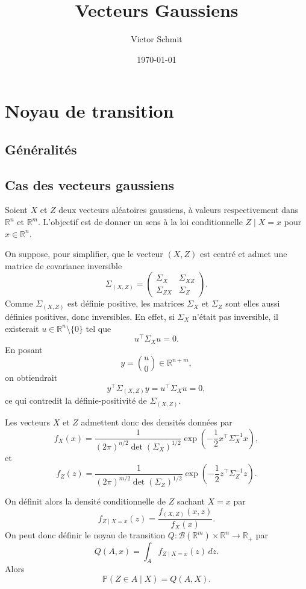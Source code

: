 \documentclass[10pt]{article}
\title{Vecteurs Gaussiens}
\author{Victor Schmit}
\date{\today}
\newcommand{\R}{\mathbb{R}}
\begin{document}
\maketitle

\tableofcontents
\newpage

\section{Noyau de transition}

\subsection{Généralités}

\subsection{Cas des vecteurs gaussiens}

Soient $X$ et $Z$ deux vecteurs aléatoires gaussiens, à valeurs respectivement dans $\R^n$ et $\R^m$.
L'objectif est de donner un sens à la loi conditionnelle $Z \mid X=x$ pour $x \in \R^n$.

\medskip

On suppose, pour simplifier, que le vecteur $(X,Z)$ est centré et admet une matrice de covariance inversible
\[
	\Sigma_{(X,Z)} =
	\begin{pmatrix}
		\Sigma_X    & \Sigma_{XZ} \\
		\Sigma_{ZX} & \Sigma_Z
	\end{pmatrix}.
\]
Comme $\Sigma_{(X,Z)}$ est définie positive, les matrices $\Sigma_X$ et $\Sigma_Z$ sont elles aussi définies positives, donc inversibles. En effet, si $\Sigma_X$ n'était pas inversible, il existerait $u \in \R^n \setminus \{0\}$ tel que
\[
	u^\top \Sigma_X u = 0.
\]
En posant
\[
	y = \binom{u}{0} \in \R^{n+m},
\]
on obtiendrait
\[
	y^\top \Sigma_{(X,Z)} y = u^\top \Sigma_X u = 0,
\]
ce qui contredit la définie-positivité de $\Sigma_{(X,Z)}$.

\medskip

Les vecteurs $X$ et $Z$ admettent donc des densités données par
\[
	f_X(x)
	=
	\frac{1}{(2\pi)^{n/2}\det(\Sigma_X)^{1/2}}
	\exp\left(-\frac12 x^\top \Sigma_X^{-1} x\right),
\]
et
\[
	f_Z(z)
	=
	\frac{1}{(2\pi)^{m/2}\det(\Sigma_Z)^{1/2}}
	\exp\left(-\frac12 z^\top \Sigma_Z^{-1} z\right).
\]

On définit alors la densité conditionnelle de $Z$ sachant $X=x$ par
\[
	f_{Z\mid X=x}(z) = \frac{f_{(X,Z)}(x,z)}{f_X(x)}.
\]
On peut donc définir le noyau de transition $Q : \mathcal B(\R^m)\times \R^n \to \R_+$ par
\[
	Q(A,x)=\int_A f_{Z\mid X=x}(z)\,dz.
\]
Alors
\[
	\mathbb P(Z\in A\mid X)=Q(A,X).
\]
\end{document}

